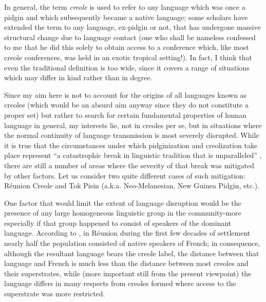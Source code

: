 In general, the term \textit{creole} is used to refer to any language which was once a pidgin and which subsequently became a native language;  some scholars have extended the term to any language, ex-pidgin or not, that has undergone massive structural change due to language contact (one who shall be nameless confessed to me that he did this solely to obtain access to a conference which, like most creole conferences, was held in an exotic tropical setting!). In fact, I think that even the traditional definition is too wide, since it covers a range of situations which may differ in kind rather than in degree.

Since my aim here is not to account for the origins of all lan\-guages known as creoles (which would be an absurd aim anyway since they do not constitute a proper set) but rather to search for certain fundamental properties of human language in general, my interests lie, not in creoles per se, but in situations where the normal continuity of language transmission is most severely disrupted. While it is true that the circumstances under which pidginization and creolization take place represent ``a catastrophic break in linguistic tradition that is unparalleled'' \citep[24]{Sankoff1979}, there are still a number of areas where the severity of that break was mitigated by other factors. Let us consider two quite different cases of such mitigation: Réunion Creole and Tok Pisin (a.k.a. Neo-Melanesian, New Guinea Pidgin, etc.).

One factor that would limit the extent of language disruption would be the presence of any large homogeneous linguistic group in the community-more especially if that group happened to consist of speakers of the dominant language. According to \citet{Chaudenson1974}, in Réunion during the first few decades of settlement nearly half the population consisted of native speakers of French; in conse\-quence, although the resultant language bears the creole label, the distance between that language and French is much less than the distance between most creoles and their superstrates, while (more important still from the present viewpoint) the language differs in many respects from creoles formed where access to the superstrate was more restricted.

